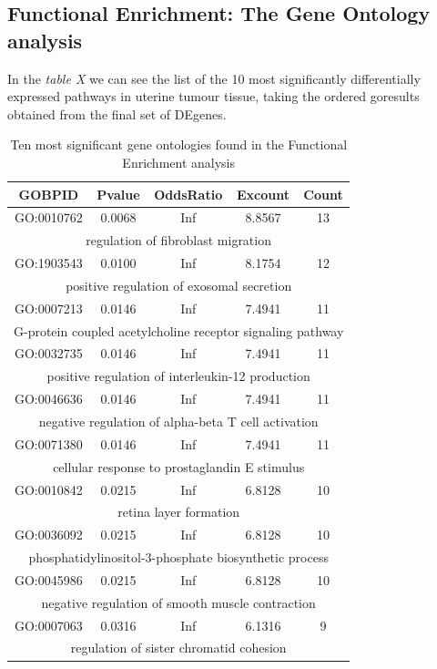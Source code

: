 \documentclass[9pt,twocolumn,twoside]{gsajnl}
\begin{document}
\subsection{Functional Enrichment: The Gene Ontology analysis}

In the \textit{table X} we can see the list of the 10 most significantly differentially expressed pathways in uterine tumour tissue, taking the ordered goresults obtained from the final set of DEgenes. 

\begin{table}
\begin{center}
\caption{Ten most significant gene ontologies found in the Functional Enrichment analysis}
 \begin{tabular}{|| c c c c c||} 
 \hline
 \textbf{GOBPID} & \textbf{Pvalue} & \textbf{OddsRatio} & \textbf{Excount} & \textbf{Count} \\ [0.5ex] 
 \hline\hline
 GO:0010762 & 0.0068 & Inf & 8.8567 & 13 \\
 \multicolumn{5}{||c||}{regulation of fibroblast migration} \\ 
 \hline
 GO:1903543 & 0.0100 & Inf & 8.1754 & 12 \\
 \multicolumn{5}{||c||}{positive regulation of exosomal secretion} \\ 
 \hline
 GO:0007213 & 0.0146 & Inf & 7.4941 & 11 \\
 \multicolumn{5}{||c||}{G-protein coupled acetylcholine receptor signaling pathway} \\ 
 \hline
 GO:0032735 & 0.0146 & Inf & 7.4941 & 11 \\
 \multicolumn{5}{||c||}{positive regulation of interleukin-12 production} \\ 
  \hline
 GO:0046636 & 0.0146 & Inf & 7.4941 & 11 \\
 \multicolumn{5}{||c||}{negative regulation of alpha-beta T cell activation} \\ 
  \hline
 GO:0071380 & 0.0146 & Inf & 7.4941 & 11 \\
 \multicolumn{5}{||c||}{cellular response to prostaglandin E stimulus} \\ 
  \hline
 GO:0010842 & 0.0215 & Inf & 6.8128 & 10 \\
 \multicolumn{5}{||c||}{retina layer formation} \\ 
  \hline
 GO:0036092 & 0.0215 & Inf & 6.8128 & 10 \\
 \multicolumn{5}{||c||}{phosphatidylinositol-3-phosphate biosynthetic process} \\ 
  \hline
 GO:0045986 & 0.0215 & Inf & 6.8128 & 10 \\
 \multicolumn{5}{||c||}{negative regulation of smooth muscle contraction} \\ 
  \hline
 GO:0007063 &  0.0316 & Inf & 6.1316 & 9 \\
 \multicolumn{5}{||c||}{regulation of sister chromatid cohesion} \\ 
 \hline
\end{tabular}
\end{center}
\end{table}
\end{document}
